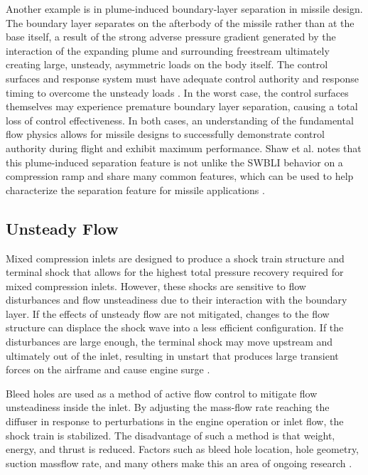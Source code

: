 Another example is in plume-induced boundary-layer separation in missile design. The boundary layer separates on the afterbody of the missile rather than at the base itself, a result of the strong adverse pressure gradient generated by the interaction of the expanding plume and surrounding freestream ultimately creating large, unsteady, asymmetric loads on the body itself. The control surfaces and response system must have adequate control authority and response timing to overcome the unsteady loads \cite{Dolling2001}. In the worst case, the control surfaces themselves may experience premature boundary layer separation, causing a total loss of control effectiveness. In both cases, an understanding of the fundamental flow physics allows for missile designs to successfully demonstrate control authority during flight and exhibit maximum performance. Shaw et al. notes that this plume-induced separation feature is not unlike the SWBLI behavior on a compression ramp and share many common features, which can be used to help characterize the separation feature for missile applications \cite{Shaw1998}.

\subsection{Unsteady Flow}
Mixed compression inlets are designed to produce a shock train structure and terminal shock that allows for the highest total pressure recovery required for mixed compression inlets. However, these shocks are sensitive to flow disturbances and flow unsteadiness due to their interaction with the boundary layer. If the effects of unsteady flow are not mitigated, changes to the flow structure can displace the shock wave into a less efficient configuration. If the disturbances are large enough, the terminal shock may move upstream and ultimately out of the inlet, resulting in unstart that produces large transient forces on the airframe and cause engine surge \cite{Dolling2001}. %

Bleed holes are used as a method of active flow control to mitigate flow unsteadiness inside the inlet. %
By adjusting the mass-flow rate reaching the diffuser in response to perturbations in the engine operation or inlet flow, the shock train is stabilized. The disadvantage of such a method is that weight, energy, and thrust is reduced. Factors such as bleed hole location, hole geometry, suction massflow rate, and many others make this an area of ongoing research \cite{Dolling2001}.

